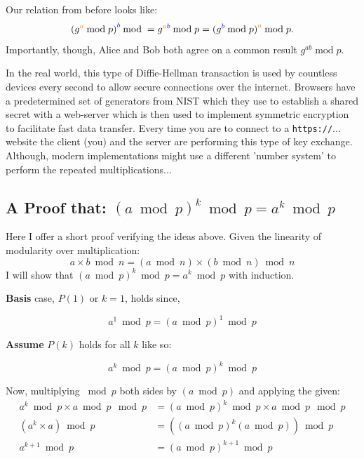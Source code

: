 \documentclass[11pt, a4paper]{report}
\begin{document}
Our relation from before looks like:
\[ (g^{\color{orange}{a}}\color{black}{\:\mathrm{mod}\; p)}^{\color{blue}{b}}\color{black}{\:\mathrm{mod}\; =\; }g^{\color{orange}{a}\color{blue}{b}} \:\mathrm{mod}\; p = (g^{\color{blue}{b}}\color{black}{\:\mathrm{mod}\; p)}^{\color{orange}{a}} \color{black}{\:\mathrm{mod}\; p.}  \]
Importantly, though, Alice and Bob both agree on a common result $g^{ab}\;\mathrm{mod}\;p$.

In the real world, this type of Diffie-Hellman transaction is used by countless devices every second to allow secure connections over the internet. Browsers have a predetermined set of generators from NIST which they use to establish a shared secret with a web-server which is then used to implement symmetric encryption to facilitate fast data transfer.\autocite{barker} Every time you are to connect to a \texttt{https://}... website the client (you) and the server are performing this type of key exchange. Although, modern implementations might use a different 'number system' to perform the repeated multiplications...

\subsection{A Proof that: $(a \bmod p)^k \bmod p = a^k \bmod p$}

Here I offer a short proof verifying the ideas above.
Given the linearity of modularity over multiplication:
$$a \times b \bmod n = (a \bmod n) \times (b \bmod n) \bmod n$$
I will show that $(a \bmod p)^k \bmod p = a^k \bmod p$ with induction.
\vspace*{0.4cm}

\textbf{Basis} case, $P(1)$ or $k=1$, holds since,

\[ a^1 \bmod p = (a \bmod p)^1 \bmod p \tag{basis}  \]

\textbf{Assume} $P(k)$ holds for all $k$ like so:

\[ a^k \bmod p = (a \bmod p)^k \bmod p \tag{P(k)} \]

Now, multiplying $ \bmod p$ both sides by $(a \bmod p)$ and applying the given:
\begin{align*}
a^k \bmod p \times a \bmod p \mod p &= (a \bmod p)^k \bmod p \times a \bmod p \mod p\\
(a^k \times a) \bmod p  &= ((a \bmod p)^k (a \bmod p)) \bmod p\\
a^{k+1} \bmod p  &= (a \bmod p)^{k+1} \bmod p \tag{P(k+1)}
\end{align*}
\end{document}
